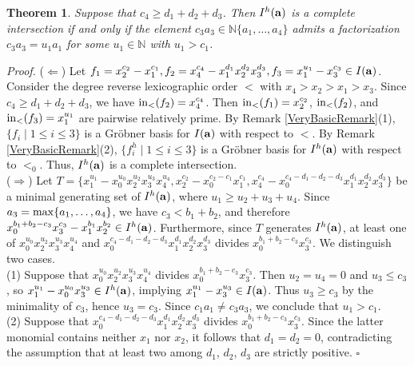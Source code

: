 \documentclass[10pt]{amsart}
\newtheorem{thm1}{Theorem}[section]
\begin{document}
\begin{thm1} \label{basicvfff} Suppose that $c_{4} \geq d_1+d_2+d_3$. Then $I^{h}({\bf a})$ is a complete intersection if and only if the element $c_{3}a_3 \in \mathbb{N}\{a_1,\ldots,a_4\}$ admits a factorization $c_{3}a_3=u_1a_{1}$ for some $u_1 \in \mathbb{N}$ with $u_{1}>c_1$.
\end{thm1}
{\em \noindent Proof.} ($\Leftarrow$) Let $f_{1}=x_{2}^{c_2}-x_{1}^{c_1}, f_{2}=x_{4}^{c_4}-x_{1}^{d_1}x_2^{d_2}x_{3}^{d_3}, f_{3}=x_{1}^{u_1}-x_{3}^{c_3} \in I({\bf a})$. Consider the degree reverse lexicographic order $<$ with $x_4>x_2>x_1>x_3$. Since $c_{4} \geq d_1+d_2+d_3$, we have ${\rm in}_{<}(f_{2})=x_{4}^{c_4}$. Then ${\rm in}_{<}(f_{1})=x_{2}^{c_2}$, ${\rm in}_{<}(f_{2})$, and ${\rm in}_{<}(f_{3})=x_{1}^{u_1}$ are pairwise relatively prime. By Remark \ref{VeryBasicRemark}(1), $\{f_i \mid 1 \leq i \leq 3\}$ is a Gr\"obner basis for $I({\bf a})$ with respect to $<$. By Remark \ref{VeryBasicRemark}(2), $\{f_{i}^h \mid 1 \leq i \leq 3\}$ is a Gr\"obner basis for $I^{h}({\bf a})$ with respect to $<_{0}$. Thus, $I^{h}({\bf a})$ is a complete intersection.\\
($\Rightarrow$) Let $T=\{x_{1}^{u_1}-x_{0}^{u_0}x_{2}^{u_2}x_{3}^{u_3}x_{4}^{u_4}, x_{2}^{c_2}-x_{0}^{c_2-c_1}x_{1}^{c_1}, x_{4}^{c_4}-x_{0}^{c_4-d_1-d_2-d_3}x_{1}^{d_1}x_{2}^{d_2}x_{3}^{d_3}\}$ be a minimal generating set of $I^{h}({\bf a})$, where $u_{1} \geq u_2+u_3+u_4$. Since $a_{3}={\rm max}\{a_1,\ldots,a_4\}$, we have $c_{3}<b_{1}+b_{2}$, and therefore $x_{0}^{b_{1}+b_{2}-c_{3}}x_{3}^{c_3}-x_{1}^{b_1}x_{2}^{b_2} \in I^{h}({\bf a})$. Furthermore, since $T$ generates $I^{h}({\bf a})$, at least one of $x_{0}^{u_0}x_{2}^{u_2}x_{3}^{u_3}x_{4}^{u_4}$ and $x_{0}^{c_4-d_1-d_2-d_3}x_{1}^{d_1}x_{2}^{d_2}x_{3}^{d_3}$ divides $x_{0}^{b_{1}+b_{2}-c_{3}}x_{3}^{c_3}$. We distinguish two cases.\\
(1) Suppose that $x_{0}^{u_0}x_{2}^{u_2}x_{3}^{u_3}x_{4}^{u_4}$ divides $x_{0}^{b_{1}+b_{2}-c_{3}}x_{3}^{c_3}$. Then $u_{2}=u_{4}=0$ and $u_{3} \leq c_{3}$, so $x_{1}^{u_1}-x_{0}^{u_0}x_{3}^{u_3} \in I^{h}({\bf a})$, implying $x_{1}^{u_1}-x_{3}^{u_3} \in I({\bf a})$. Thus $u_{3} \geq c_{3}$ by the minimality of $c_3$, hence $u_{3}=c_{3}$. Since $c_{1}a_1 \neq c_{3}a_3$, we conclude that $u_1>c_1$.\\
(2) Suppose that $x_{0}^{c_4-d_1-d_2-d_3}x_{1}^{d_1}x_{2}^{d_2}x_{3}^{d_3}$ divides $x_{0}^{b_{1}+b_{2}-c_{3}}x_{3}^{c_3}$. Since the latter monomial contains neither $x_1$ nor $x_2$, it follows that $d_1=d_2=0$, contradicting the assumption that at least two among $d_1$, $d_2$, $d_3$ are strictly positive.  \hfill $\square$ \par\vspace{0.5\baselineskip}
\end{document}
